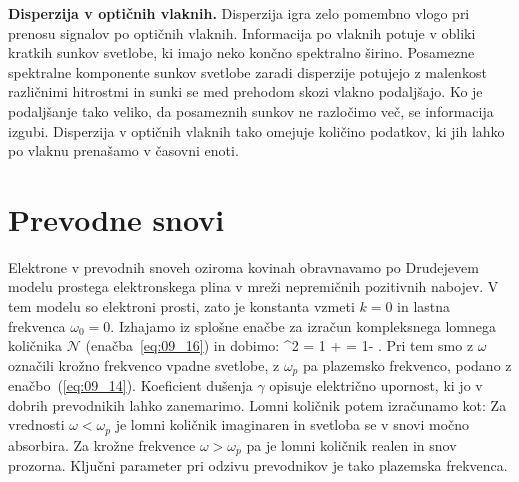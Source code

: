 \begin{example}{\bf Disperzija v optičnih vlaknih.}
Disperzija igra zelo pomembno vlogo pri prenosu signalov
po optičnih vlaknih. Informacija po vlaknih potuje
v obliki kratkih sunkov svetlobe, ki imajo neko
končno spektralno širino. Posamezne spektralne 
komponente sunkov svetlobe zaradi disperzije 
potujejo z malenkost različnimi hitrostmi in sunki se 
med prehodom skozi vlakno podaljšajo. Ko je podaljšanje
tako veliko, da posameznih sunkov ne razločimo več, 
se informacija izgubi.  
Disperzija v optičnih vlaknih tako omejuje količino 
podatkov, ki jih lahko po vlaknu prenašamo v časovni enoti.
\end{example}

\section{Prevodne snovi}

Elektrone v prevodnih snoveh oziroma kovinah
obravnavamo po Drudejevem modelu prostega elektronskega plina
v mreži nepremičnih pozitivnih nabojev. V tem modelu so elektroni prosti,
zato je konstanta vzmeti $k=0$ in lastna frekvenca $\omega_0=0$. Izhajamo 
iz splošne enačbe za izračun kompleksnega lomnega količnika $\mathcal{N}$
(enačba~\ref{eq:09_16}) in dobimo:
\beq
{}^2 = 1 +  = 1- 
.
\label{eq:09_36}
\eeq
Pri tem smo z $\omega$ označili krožno frekvenco vpadne svetlobe, z
$\omega_p$ pa plazemsko frekvenco, podano z enačbo~(\ref{eq:09_14}). 
Koeficient dušenja $\gamma$ opisuje električno upornost, ki jo v dobrih
prevodnikih lahko zanemarimo. Lomni količnik potem izračunamo kot:
Za vrednosti $\omega < \omega_p$ je lomni količnik imaginaren in svetloba se v snovi
močno absorbira. Za krožne frekvence $\omega > \omega_p$ pa je lomni količnik realen 
in snov prozorna. Ključni parameter pri odzivu prevodnikov je tako plazemska frekvenca. 

